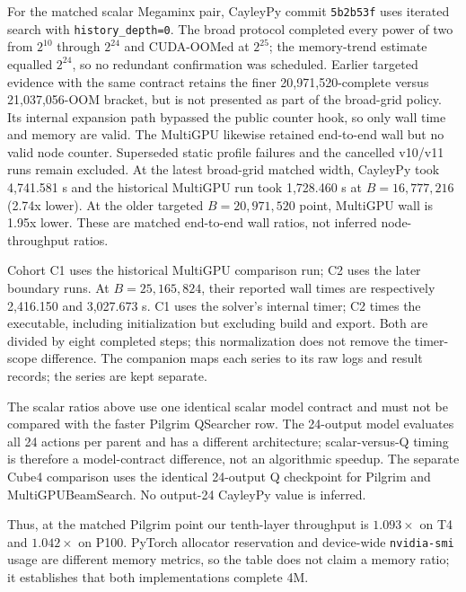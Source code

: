 \documentclass[10pt,twocolumn]{article}
\begin{document}
For the matched scalar Megaminx pair, CayleyPy commit \texttt{5b2b53f} uses
iterated search with \texttt{history\_depth=0}. The broad protocol completed
every power of two from $2^{10}$ through $2^{24}$ and CUDA-OOMed at $2^{25}$;
the memory-trend estimate equalled $2^{24}$, so no redundant confirmation was
scheduled. Earlier targeted evidence with the same contract retains the finer
20,971,520-complete versus 21,037,056-OOM bracket, but is not presented as part
of the broad-grid policy. Its internal expansion path
bypassed the public counter hook, so only wall time and memory are valid.  The
MultiGPU likewise retained end-to-end wall but no valid node counter. Superseded static
profile failures and the cancelled v10/v11 runs remain excluded.
At the latest broad-grid matched width, CayleyPy took 4,741.581 s and the
historical MultiGPU run took 1,728.460 s at $B=16{,}777{,}216$ (2.74x lower).
At the older targeted $B=20{,}971{,}520$ point, MultiGPU wall is 1.95x lower.
These are matched
end-to-end wall ratios, not inferred node-throughput ratios.

Cohort C1 uses the historical MultiGPU comparison run; C2 uses the later
boundary runs. At $B=25{,}165{,}824$, their reported wall times are respectively
2,416.150 and 3,027.673 s. C1 uses the solver's internal timer; C2 times the
executable, including initialization but excluding build and export. Both are
divided by eight completed steps; this normalization does not remove the timer-scope difference.
The companion 
maps each series to its raw logs and result records; the series are kept separate.

The scalar ratios above use one identical scalar model contract and must not be
compared with the faster Pilgrim QSearcher row. The 24-output model evaluates
all 24 actions per parent and has a different architecture; scalar-versus-Q
timing is therefore a model-contract difference, not an algorithmic speedup.
The separate Cube4 comparison uses the identical 24-output Q checkpoint for
Pilgrim and MultiGPUBeamSearch. No output-24 CayleyPy value is inferred.

Thus, at the matched Pilgrim point our
tenth-layer throughput is $1.093\times$ on T4
and $1.042\times$ on P100.  PyTorch allocator reservation and device-wide
\texttt{nvidia-smi} usage are different memory metrics, so the table does not
claim a memory ratio; it establishes that both implementations complete 4M.
\end{document}
